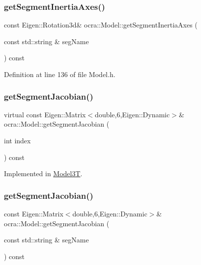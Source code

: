 \subsubsection{\texorpdfstring{get\+Segment\+Inertia\+Axes()}{getSegmentInertiaAxes()}\hspace{0.1cm}{\footnotesize\ttfamily [2/2]}}
{\footnotesize\ttfamily const Eigen\+::\+Rotation3d\& ocra\+::\+Model\+::get\+Segment\+Inertia\+Axes (\begin{DoxyParamCaption}\item[{const std\+::string \&}]{seg\+Name }\end{DoxyParamCaption}) const\hspace{0.3cm}{\ttfamily [inline]}}



Definition at line 136 of file Model.\+h.

\hypertarget{classocra_1_1Model_a626aed0875f6336c2ecc0147bc8c7d4e}{}\label{classocra_1_1Model_a626aed0875f6336c2ecc0147bc8c7d4e} 
\subsubsection{\texorpdfstring{get\+Segment\+Jacobian()}{getSegmentJacobian()}\hspace{0.1cm}{\footnotesize\ttfamily [1/2]}}
{\footnotesize\ttfamily virtual const Eigen\+::\+Matrix$<$double,6,Eigen\+::\+Dynamic$>$\& ocra\+::\+Model\+::get\+Segment\+Jacobian (\begin{DoxyParamCaption}\item[{int}]{index }\end{DoxyParamCaption}) const\hspace{0.3cm}{\ttfamily [pure virtual]}}



Implemented in \hyperlink{classModel3T_a3c138d685389144406ab0bd219e7bb36}{Model3T}.

\hypertarget{classocra_1_1Model_abed0a7830611b6a76c57e0d7ab93e59b}{}\label{classocra_1_1Model_abed0a7830611b6a76c57e0d7ab93e59b} 
\subsubsection{\texorpdfstring{get\+Segment\+Jacobian()}{getSegmentJacobian()}\hspace{0.1cm}{\footnotesize\ttfamily [2/2]}}
{\footnotesize\ttfamily const Eigen\+::\+Matrix$<$double,6,Eigen\+::\+Dynamic$>$\& ocra\+::\+Model\+::get\+Segment\+Jacobian (\begin{DoxyParamCaption}\item[{const std\+::string \&}]{seg\+Name }\end{DoxyParamCaption}) const\hspace{0.3cm}{\ttfamily [inline]}}



